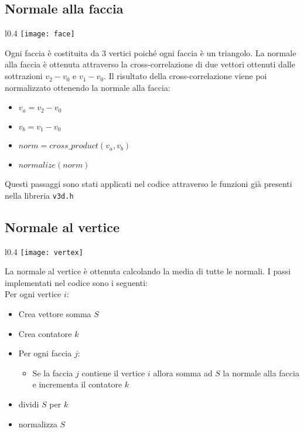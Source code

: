 \subsection{Normale alla faccia}

\begin{wrapfigure}{l}{0.4\textwidth}
    \centering
    \vspace{-0.5cm}
    \texttt{[image: face]}
    \caption{\label{fig:face}}
    \vspace{-0.5cm}
\end{wrapfigure}
Ogni faccia è costituita da 3 vertici poiché ogni faccia è un triangolo. La normale alla faccia è ottenuta attraverso la cross-correlazione di due vettori ottenuti dalle sottrazioni $v_2 - v_0$ e $v_1 - v_0$. Il risultato della cross-correlazione viene poi normalizzato ottenendo la normale alla faccia: 
\begin{itemize}
  \item $v_a = v_2 - v_0$
  \item $v_b = v_1 - v_0$
  \item $norm = cross\_product(v_a, v_b)$
  \item $normalize(norm)$
\end{itemize}

Questi passaggi sono stati applicati nel codice attraverso le funzioni già presenti nella libreria \texttt{v3d.h}

\subsection{Normale al vertice}

\begin{wrapfigure}{l}{0.4\textwidth}
    \centering
    \vspace{-0.5cm}
    \texttt{[image: vertex]}
    \caption{\label{fig:vertex}}
    \vspace{-0.5cm}
\end{wrapfigure}

La normale al vertice è ottenuta calcolando la media di tutte le normali. I passi implementati nel codice sono i seguenti:\\

\noindent Per ogni vertice $i$: 
  	 \begin{itemize}
  			  \item Crea vettore somma $S$
  			\item Crea contatore $k$
  			\item Per ogni faccia $j$:
  				\begin{itemize}
  					\item Se la faccia $j$ contiene il vertice $i$ allora somma ad $S$ la normale alla faccia e incrementa il contatore $k$
  				\end{itemize}
  			\item dividi $S$ per $k$
  			\item normalizza $S$
		\end{itemize}

